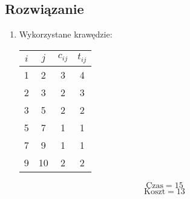 \documentclass{article}
\begin{document}
\subsection{Rozwiązanie}
\begin{enumerate}[label=(\alph*)]
    \item Wykorzystane krawędzie:
        \begin{table}[H]
            \centering
            \begin{tabular}{|c|c|c|c|}
                \hline
                $i$ & $j$ & $c_{ij}$ & $t_{ij}$ \\
                \hline
                \hline
                1 & 2 & 3 & 4 \\
                \hline
                2 & 3 & 2 & 3 \\
                \hline
                3 & 5 & 2 & 2 \\
                \hline
                5 & 7 & 1 & 1 \\
                \hline
                7 & 9 & 1 & 1 \\
                \hline
                9 & 10 & 2 & 2 \\
                \hline
            \end{tabular}
            \label{tabela_wyniki4.1}
        \end{table}
        \[\text{Czas} = 15\]
        \[\text{Koszt} = 13\]
    

\end{enumerate}
\end{document}
